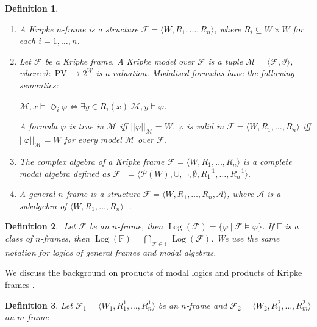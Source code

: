 \documentclass[a4paper]{article}
\theoremstyle{defin}
\newtheorem{defin}{Definition}
\theoremstyle{theorem}
\theoremstyle{prop}
\theoremstyle{lemma}
\theoremstyle{ex}
\theoremstyle{col}
\begin{document}
\begin{defin}
$ $
\begin{enumerate}
  \item A Kripke $n$-frame is a structure $\mathcal{F} = \langle W, R_1, \dots, R_n \rangle$, where $R_i \subseteq W \times W$ for each $i = 1,\dots, n$.
  \item Let $\mathcal{F}$ be a Kripke frame. A Kripke model over $\mathcal{F}$ is a tuple $\mathcal{M} = \langle \mathcal{F}, \vartheta \rangle$, where $\vartheta : \operatorname{PV} \to 2^W$ is a valuation. Modalised formulas have the following semantics:
  \begin{center}
    $\mathcal{M}, x \models \Diamond_i \varphi \Leftrightarrow \exists y \in R_i(x) \: \mathcal{M}, y \models \varphi$.
  \end{center}
  A formula $\varphi$ is true in $\mathcal{M}$ iff $||\varphi||_{\mathcal{M}} = W$. $\varphi$ is valid in $\mathcal{F} = \langle W, R_1, \dots, R_n \rangle$ iff $||\varphi||_{\mathcal{M}} = W$ for every model $\mathcal{M}$ over $\mathcal{F}$.
  \item The complex algebra of a Kripke frame $\mathcal{F} = \langle W, R_1, \dots, R_n \rangle$ is a complete modal algebra defined as $\mathcal{F}^{+} = \langle \mathcal{P}(W), \cup, \neg, \emptyset, R_1^{-1}, \dots, R_n^{-1} \rangle$.
  \item A general $n$-frame is a structure $\mathcal{F} = \langle W, R_1, \dots, R_n, \mathcal{A} \rangle$, where $\mathcal{A}$ is a subalgebra of $\langle W, R_1, \dots, R_n \rangle^{+}$.
\end{enumerate}
\end{defin}

\begin{defin}
$ $
  Let $\mathcal{F}$ be an $n$-frame, then $\operatorname{Log}(\mathcal{F}) = \{ \varphi \: | \: \mathcal{F} \models \varphi \}$. If $\mathbb{F}$ is a class of $n$-frames,
  then $\operatorname{Log}(\mathbb{F}) = \bigcap \limits_{\mathcal{F} \in \mathbb{F}} \operatorname{Log}(\mathcal{F})$. We use the same notation for logics of general frames and modal algebras.
\end{defin}

We discuss the background on products of modal logics and products of Kripke frames \cite{kurucz2007combining} \cite{kurucz2003many}.

\begin{defin} Let $\mathcal{F}_1 = \langle W_1, R^1_1, \dots, R^1_n\rangle$ be an $n$-frame and $\mathcal{F}_2 = \langle W_2, R^2_1, \dots, R^2_m\rangle$ an $m$-frame
\end{defin}
\end{document}
